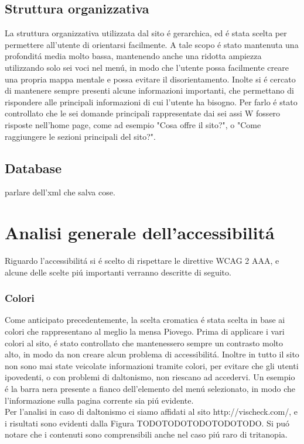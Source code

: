 \documentclass[10pt,a4paper,onecolumn]{article}
\begin{document}
\subsection{Struttura organizzativa}

La struttura organizzativa utilizzata dal sito \'e gerarchica, ed \'e stata scelta per permettere all'utente di orientarsi facilmente. A tale scopo \'e stato mantenuta una profondit\'a media molto bassa, mantenendo anche una ridotta ampiezza utilizzando solo sei voci nel men\'u, in modo che l'utente possa facilmente creare una propria mappa mentale e possa evitare il disorientamento.
Inolte si \'e cercato di mantenere sempre presenti alcune informazioni importanti, che permettano di rispondere alle principali informazioni di cui l'utente ha bisogno. Per farlo \'e stato controllato che le sei domande principali rappresentate dai sei assi W fossero risposte nell'home page, come ad esempio "Cosa offre il sito?", o "Come raggiungere le sezioni principali del sito?".

\subsection{Database}

parlare dell'xml che salva cose.

\section{Analisi generale dell'accessibilit\'a}

Riguardo l'accessibilit\'a si \'e scelto di rispettare le direttive WCAG 2 AAA, e alcune delle scelte pi\'u importanti verranno descritte di seguito.

\subsubsection{Colori}

Come anticipato precedentemente, la scelta cromatica \'e stata scelta in base ai colori che rappresentano al meglio la mensa Piovego. Prima di applicare i vari colori al sito, \'e stato controllato che mantenessero sempre un contrasto molto alto, in modo da non creare alcun problema di accessibilit\'a. Inoltre in tutto il sito non sono mai state veicolate informazioni tramite colori, per evitare che gli utenti ipovedenti, o con problemi di daltonismo, non riescano ad accedervi. Un esempio \'e la barra nera presente a fianco dell'elemento del men\'u selezionato, in modo che l'informazione sulla pagina corrente sia pi\'u evidente. \\
Per l'analisi in caso di daltonismo ci siamo affidati al sito http://vischeck.com/, e i risultati sono evidenti dalla Figura TODOTODOTODOTODOTODO. Si pu\'o notare che i contenuti sono comprensibili anche nel caso pi\'u raro di tritanopia.
\end{document}
